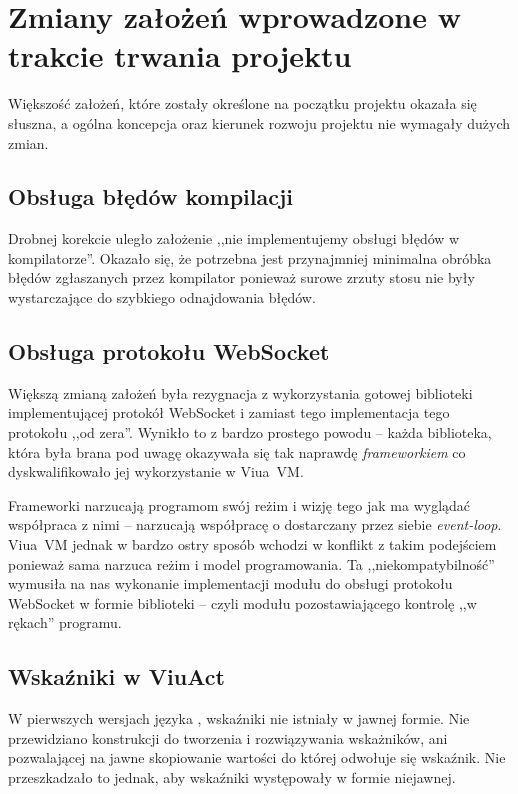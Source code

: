 \section{Zmiany założeń wprowadzone w trakcie trwania projektu}

Większość założeń, które zostały określone na początku projektu okazała się
słuszna, a ogólna koncepcja oraz kierunek rozwoju projektu nie wymagały dużych
zmian.

\subsection{Obsługa błędów kompilacji}

Drobnej korekcie uległo założenie ,,nie implementujemy obsługi błędów w
kompilatorze''. Okazało się, że potrzebna jest przynajmniej minimalna obróbka
błędów zgłaszanych przez kompilator ponieważ surowe zrzuty stosu nie były
wystarczające do szybkiego odnajdowania błędów.

\subsection{Obsługa protokołu WebSocket}

Większą zmianą założeń była rezygnacja z wykorzystania gotowej biblioteki
implementującej protokół WebSocket i zamiast tego implementacja tego protokołu
,,od zera''. Wynikło to z bardzo prostego powodu -- każda biblioteka, która
była brana pod uwagę okazywała się tak naprawdę \emph{frameworkiem} co
dyskwalifikowało jej wykorzystanie w Viua~VM.

Frameworki narzucają programom swój reżim i wizję tego jak ma wyglądać
współpraca z nimi -- narzucają współpracę o dostarczany przez siebie
\emph{event-loop}. Viua~VM jednak w bardzo ostry sposób wchodzi w konflikt z
takim podejściem ponieważ sama narzuca reżim i model programowania.  Ta
,,niekompatybilność'' wymusiła na nas wykonanie implementacji modułu do obsługi
protokołu WebSocket w formie biblioteki -- czyli modułu pozostawiającego
kontrolę ,,w rękach'' programu.

\subsection{Wskaźniki w ViuAct}

W pierwszych wersjach języka \ViuAct, wskaźniki nie istniały w jawnej formie.
Nie przewidziano konstrukcji do tworzenia i rozwiązywania wskażników, ani
pozwalającej na jawne skopiowanie wartości do której odwołuje się wskaźnik.
Nie przeszkadzało to jednak, aby wskaźniki występowały w formie niejawnej.

